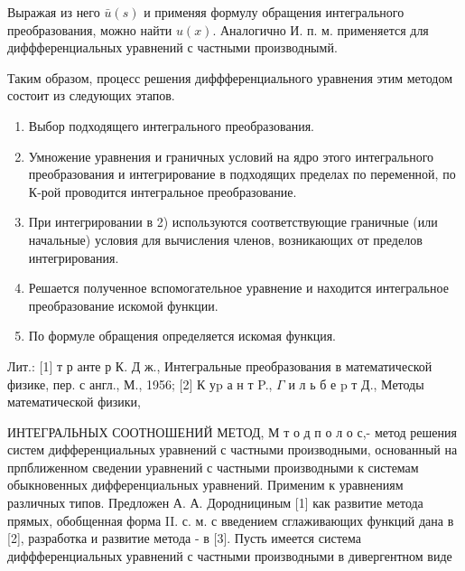 \documentclass[10pt]{article}
\begin{document}
Выражая из него $\bar{u}(s)$ и применяя формулу обращения интегрального преобразования, можно найти $u(x)$. Аналогично И. п. м. применяется для диффференциальных уравнений с частными производнымй.



Таким образом, процесс решения диффференциального уравнения этим методом состоит из следующих этапов.



\begin{enumerate}

  \item Выбор подходящего интегрального преобразования.



  \item Умножение уравнения и граничных условий на ядро этого интегрального преобразования и интегрирование в подходящих пределах по переменной, по К-рой проводится интегральное преобразование.



  \item При интегрировании в 2) используются соответствующие граничные (или начальные) условия для вычисления членов, возникающих от пределов интегрирования.



  \item Решается полученное вспомогательное уравнение и находится интегральное преобразование искомой функции.



  \item По формуле обращения определяется искомая функция.



\end{enumerate}



Лит.: [1] т р анте р К. Д ж., Интегральные преобразования в математической физике, пер. с англ., М., 1956; [2] К уp а н т P., $\Gamma$ и л ь б е p т Д., Методы математической физики,



ИНТЕГРАЛЬНЫХ СООТНОШЕНИЙ МЕТОД, М т о д п о л о с,- метод решения систем дифференциальных уравнений с частными производными, основанный на прпближенном сведении уравнений с частными производными к системам обыкновенных дифференциальных уравнений. Применим к уравнениям различных типов. Предложен А. А. Дороднициным [1] как развитие метода прямых, обобщенная форма II. с. м. с введением сглаживающих функций дана в [2], разработка и развитие метода - в [3]. Пусть имеется система диффференциальных уравнений с частными производными в дивергентном виде
\end{document}
